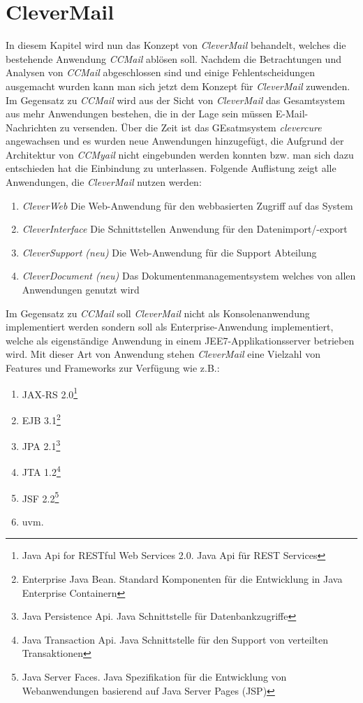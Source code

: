 \chapter{CleverMail}
\label{cha:clevermail}
In diesem Kapitel wird nun das Konzept von \emph{CleverMail} behandelt, welches die bestehende Anwendung \emph{CCMail} ablösen soll. Nachdem die Betrachtungen und Analysen von \emph{CCMail} abgeschlossen sind und einige Fehlentscheidungen ausgemacht wurden kann man sich jetzt dem Konzept für \emph{CleverMail} zuwenden. Im Gegensatz zu \emph{CCMail} wird aus der Sicht von \emph{CleverMail} das Gesamtsystem aus mehr Anwendungen bestehen, die in der Lage sein müssen E-Mail-Nachrichten zu versenden. Über die Zeit ist das GEsatmsystem \emph{clevercure} angewachsen und es wurden neue Anwendungen hinzugefügt, die Aufgrund der Architektur von \emph{CCMyail} nicht eingebunden werden konnten bzw. man sich dazu entschieden hat die Einbindung zu unterlassen.
\newline
\newline
Folgende Auflistung zeigt alle Anwendungen, die \emph{CleverMail} nutzen werden:
\begin{enumerate}
	\item\emph{CleverWeb}
	\newline
	Die Web-Anwendung für den webbasierten Zugriff auf das System
	\item\emph{CleverInterface}
	\newline
	Die Schnittstellen Anwendung für den Datenimport/-export
	\item\emph{CleverSupport (neu)}
	\newline
	Die Web-Anwendung für die Support Abteilung
	\item\emph{CleverDocument (neu)}
	\newline
	 Das Dokumentenmanagementsystem welches von allen Anwendungen genutzt wird
\end{enumerate}
Im Gegensatz zu \emph{CCMail} soll \emph{CleverMail} nicht als Konsolenanwendung implementiert werden sondern soll als Enterprise-Anwendung implementiert, welche als eigenständige Anwendung in einem JEE7-Applikationsserver betrieben wird.
\newpage
Mit dieser Art von Anwendung stehen \emph{CleverMail} eine Vielzahl von Features und Frameworks zur Verfügung wie z.B.: 
\begin{enumerate}
	\item JAX-RS 2.0\footnote{Java Api for RESTful Web Services 2.0. Java Api für REST Services}
	\item EJB 3.1\footnote{Enterprise Java Bean. Standard Komponenten für die Entwicklung in Java Enterprise Containern} 
	\item JPA 2.1\footnote{Java Persistence Api. Java Schnittstelle für Datenbankzugriffe} 
	\item JTA 1.2\footnote{Java Transaction Api. Java Schnittstelle für den Support von verteilten Transaktionen}
	\item JSF 2.2\footnote{Java Server Faces. Java Spezifikation für die Entwicklung von Webanwendungen basierend auf Java Server Pages (JSP)}
	\item uvm.
\end{enumerate}

